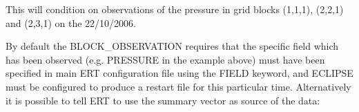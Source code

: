 \documentclass[letterpaper,10pt,english]{sphinxmanual}
\begin{document}
%
\begin{sphinxVerbatim}[commandchars=\\\{\}]
 
     
      

                          
                          
                          
\end{sphinxVerbatim}

This will condition on observations of the pressure in grid blocks
(1,1,1), (2,2,1) and (2,3,1) on the 22/10/2006.

By default the BLOCK\_OBSERVATION requires that the specific field
which has been observed (e.g. PRESSURE in the example above) must have
been specified in main ERT configuration file using the FIELD keyword,
and ECLIPSE must be configured to produce a restart file for this
particular time. Alternatively it is possible to tell ERT to use the
summary vector as source of the data:
\end{document}
